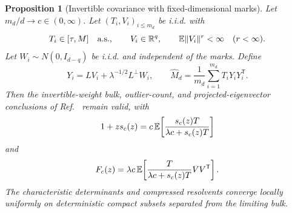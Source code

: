 \documentclass[
  aps,
  prl,
  10pt,
  onecolumn,
  longbibliography,
  nofootinbib
]{revtex4-2}
\newtheorem{proposition}[theorem]{Proposition}
\theoremstyle{remark}
\begin{document}
\begin{proposition}[Invertible covariance with fixed-dimensional marks]
\label{S:marked-theorem}
Let $m_d/d\to c\in(0,\infty)$. Let $(T_i,V_i)_{i\le m_d}$ be i.i.d. with
\begin{equation}
T_i\in[\tau,M]\quad\text{a.s.},\qquad
V_i\in\mathbb{R}^q,\qquad
\mathbb{E}\|V_i\|^r<\infty\quad(r<\infty).
\end{equation}
Let $W_i\sim N(0,I_{d-q})$ be i.i.d. and independent of the marks. Define
\begin{equation}
Y_i=LV_i+\lambda^{-1/2}L^\perp W_i,\qquad
\widehat M_d=\frac1{m_d}\sum_{i=1}^{m_d}T_iY_iY_i^{\mathsf T}.
\end{equation}
Then the invertible-weight bulk, outlier-count, and projected-eigenvector conclusions of Ref.~\cite{BenArousEtAl2025} remain valid, with
\begin{equation}
1+zs_c(z)
=
c\,\mathbb{E}\!\left[
\frac{s_c(z)T}{\lambda c+s_c(z)T}
\right]
\label{S:marked-fixed}
\end{equation}
and
\begin{equation}
F_c(z)
=
\lambda c\,\mathbb{E}\!\left[
\frac{T}{\lambda c+s_c(z)T}VV^{\mathsf T}
\right].
\label{S:marked-F}
\end{equation}
The characteristic determinants and compressed resolvents converge locally uniformly on deterministic compact subsets separated from the limiting bulk.
\end{proposition}
\end{document}
